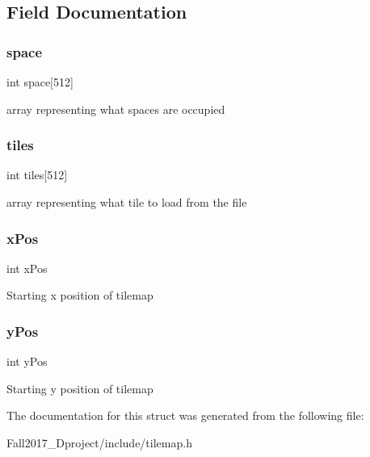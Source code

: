 \subsection{Field Documentation}
\mbox{\label{structtilemap__s_a1bd608d2e076f47094fd2544223e7ddd}} 
\subsubsection{\texorpdfstring{space}{space}}
{\footnotesize\ttfamily int space\mbox{[}512\mbox{]}}

array representing what spaces are occupied \mbox{\label{structtilemap__s_a0d1eb4f410c73be99ca705d6c88032bb}} 
\subsubsection{\texorpdfstring{tiles}{tiles}}
{\footnotesize\ttfamily int tiles\mbox{[}512\mbox{]}}

array representing what tile to load from the file \mbox{\label{structtilemap__s_a6806e78862b165988ca9b855e230084e}} 
\subsubsection{\texorpdfstring{x\+Pos}{xPos}}
{\footnotesize\ttfamily int x\+Pos}

Starting x position of tilemap \mbox{\label{structtilemap__s_adbae1d6f68d046bbecaa7230baf64762}} 
\subsubsection{\texorpdfstring{y\+Pos}{yPos}}
{\footnotesize\ttfamily int y\+Pos}

Starting y position of tilemap 

The documentation for this struct was generated from the following file\+:\begin{DoxyCompactItemize}
\item 
Fall2017\+\_\+Dproject/include/tilemap.\+h\end{DoxyCompactItemize}
